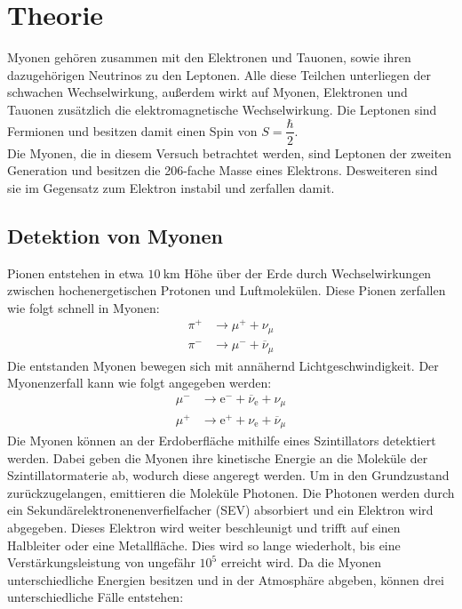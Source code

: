 
\section{Theorie}
\label{sec:Theorie}
Myonen gehören zusammen mit den Elektronen und Tauonen, sowie ihren dazugehörigen Neutrinos zu den Leptonen. Alle diese Teilchen unterliegen der schwachen Wechselwirkung, außerdem wirkt auf
Myonen, Elektronen und Tauonen zusätzlich die elektromagnetische Wechselwirkung. Die Leptonen sind Fermionen und besitzen damit einen Spin von $S=\dfrac{\hbar}{2}$. \\
Die Myonen, die in diesem Versuch betrachtet werden, sind Leptonen der zweiten Generation und besitzen die 206-fache Masse eines Elektrons.
Desweiteren sind sie im Gegensatz zum Elektron instabil und zerfallen damit.
\subsection{Detektion von Myonen}
\label{sec:Detektion}
Pionen entstehen in etwa $\SI{10}{\kilo\meter}$ Höhe über der Erde durch Wechselwirkungen zwischen hochenergetischen Protonen und Luftmolekülen. Diese Pionen zerfallen wie folgt schnell in Myonen:
\begin{align*}
  \pi^+ &\to \mu^+ + \nu_{\mu} \\
  \pi^- &\to \mu^- + \overline{\nu}_{\mu}
\end{align*}
Die entstanden Myonen bewegen sich mit annähernd Lichtgeschwindigkeit. Der Myonenzerfall kann wie folgt angegeben werden:
\begin{align*}
  \mu^- &\to \mathrm{e}^- + \overline{\nu}_\mathrm{e} + \nu_{\mu} \\
  \mu^+ &\to \mathrm{e}^+ + \nu_\mathrm{e} + \overline{\nu}_{\mu}
\end{align*}
Die Myonen können an der Erdoberfläche mithilfe eines Szintillators detektiert werden. Dabei geben die Myonen ihre kinetische Energie an die Moleküle der Szintillatormaterie ab, wodurch diese angeregt werden. Um in den Grundzustand zurückzugelangen, emittieren die Moleküle Photonen. Die Photonen werden durch ein Sekundärelektronenenverfielfacher (SEV) absorbiert und ein Elektron wird abgegeben. Dieses Elektron wird weiter beschleunigt und trifft auf einen Halbleiter oder eine Metallfläche. Dies wird so lange wiederholt, bis eine Verstärkungsleistung von ungefähr $10^5$ erreicht wird.
Da die Myonen unterschiedliche Energien besitzen und in der Atmosphäre abgeben, können drei unterschiedliche Fälle entstehen:
